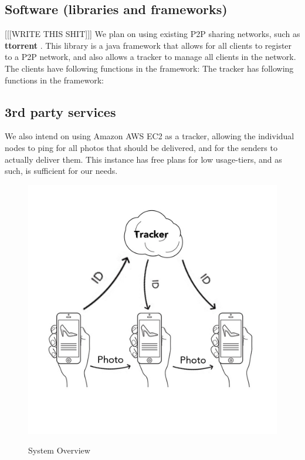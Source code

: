 \documentclass{report}
\newcommand{\lfig}[1]{\label{fig:#1}}
\begin{document}
\subsection{Software (libraries and frameworks)}
[[[WRITE THIS SHIT]]]
We plan on using existing P2P sharing networks, such as \textbf{ttorrent} \cite{ttorrentLink}.
This library is a java framework that allows for all clients to register to a P2P network, and also allows a tracker to manage all clients in the network.
The clients have following functions in the framework:
The tracker has following functions in the framework:

\subsection{3rd party services}
We also intend on using Amazon AWS EC2  as a tracker, allowing the individual nodes to ping for all photos that should be delivered, and for the senders to actually deliver them.
This instance has free plans for low usage-tiers, and as such, is sufficient for our needs.

\begin{figure}[h]
	\centering
    \includegraphics[width=\columnwidth]{overview.jpg}
    \lfig{system-overview}
    \vspace{-5mm} %
	\caption{System Overview~\cite{estimote}}
\end{figure}
\end{document}
